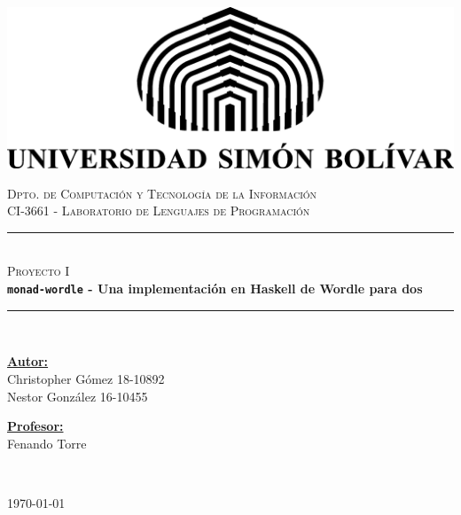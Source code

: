 \documentclass[11pt]{article}
\begin{document}

\begin{center} 
   \newcommand{\HRule}{\rule{\linewidth}{0.5mm}}  

   \begin{minipage}{0.48\textwidth}
      \begin{center}
         \includegraphics[scale = 0.8]{logotip.png}
      \end{center}
   \end{minipage}

   \vspace*{0.2cm}
   \textsc{\large Dpto. de Computación y Tecnología de la Información} \\ 
   \textsc{\large CI-3661 - Laboratorio de Lenguajes de Programación} \\ [4cm] 

   \vspace*{1cm}
   \HRule \\ [0.4cm]
   \textsc{\Large Proyecto I } \\ [0.4cm]
   {\Huge \bfseries \texttt{monad-wordle} - Una implementación en Haskell de Wordle para dos} \\ [0.4cm] 
   \HRule \\ [6cm]

   \begin{minipage}{\textwidth} 
      \begin{flushleft} \large    
         \textbf{\underline{Autor:}} \\ 
         Christopher Gómez 18-10892 \\
         Nestor González 16-10455 \\
      \end{flushleft}
   \end{minipage}

   \begin{minipage}{\textwidth}
      \vspace{-2cm}
      \begin{flushright} \large
         \textbf{\underline{Profesor:}} \\
         Fenando Torre 
      \end{flushright}
   \end{minipage} \\ [2cm]

   \begin{center}
      {\large \today}
   \end{center}
\end{center}
\end{document}
